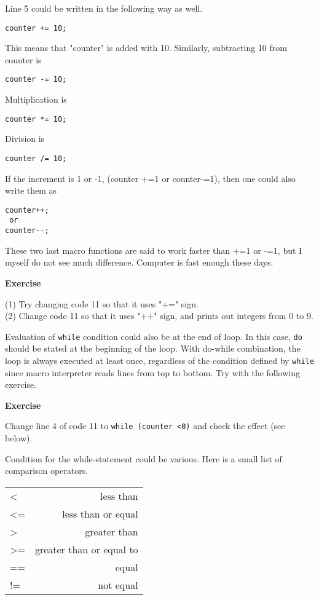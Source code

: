 \documentclass[11pt,a4paper,oneside]{report}
\newenvironment{indentexercise}[1]%
{{\setlength{\leftmargin}{2em}}%
\textbf{Exercise \thesubsection-#1}%
\begin{list}{}%
	\item%
}
{\end{list}}
\newenvironment{indentCom}%
{\begin{list}{}%
         {\setlength{\leftmargin}{1em}}%
         \item[]%
}
{\end{list}}
\newcommand{\ilcom}[1]{\texttt{\small#1}}
\begin{document}
Line 5 could be written in the following way as well.
\begin{lstlisting}[numbers=none]
counter += 10;
\end{lstlisting}
This means that "counter" is added with 10. Similarly, subtracting 10 from counter is 
\begin{lstlisting}[numbers=none]
counter -= 10;
\end{lstlisting}
Multiplication is 
\begin{lstlisting}[numbers=none]
counter *= 10;
\end{lstlisting}
Division is
\begin{lstlisting}[numbers=none]
counter /= 10;
\end{lstlisting}
If the increment is 1 or -1, (counter +=1 or counter-=1), then one could also write them  as 
\begin{lstlisting}[numbers=none]
counter++;
 or 
counter--;
\end{lstlisting}
These two last macro functions are said to work faster than +=1 or -=1, but I myself do not see much difference. Computer is fast enough these days. 

\begin{indentexercise}{1}
(1) Try changing code 11 so that it uses "+=" sign.\\
(2) Change code 11 so that it uses "++" sign, and prints out integers from 0 to 9.\\
\end{indentexercise}
Evaluation of \ilcom{while} condition could also be at the end of loop. In this case, \ilcom{do} should be stated at the beginning of the loop. With do-while combination, the loop is always executed at least once, regardless of the condition defined by \ilcom{while} since macro interpreter reads lines from top to bottom. Try with the following exercise.

\begin{indentexercise}{2}
Change line 4 of code 11 to \ilcom{while (counter <0)} and check the effect (see below).
\end{indentexercise}



Condition for the while-statement could be various. Here is a small list of comparison operators.

\begin{indentCom}
 \begin{tabular*}{0.5\textwidth}{ l r }
< & less than \\
<= & less than or equal\\ 
> & greater than\\ 
>= & greater than or equal to\\
== & equal\\
!= & not equal\\
 \end{tabular*}
\end{indentCom}
\end{document}
